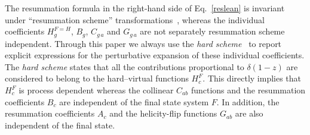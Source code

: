 \documentclass[12pt]{article}
\begin{document}
The resummation formula in the right-hand side of Eq.~\eqref{reslean} is invariant under ``resummation scheme''  transformations~\cite{Catani:2000vq}, whereas the individual coefficients $H_g^{F=H}$, $B_{g}$, $C_{g\, a}$ and $G_{g\, a}$ are not separately resummation scheme independent. Through this paper we always use the \textit{hard scheme}~\cite{Catani:2013tia} to report explicit expressions for the perturbative expansion of these individual coefficients. The \textit{hard scheme} states that all the contributions proportional to $\delta(1-z)$ are considered to belong to the hard--virtual functions $H_c^{F}$. This directly implies that $H_c^{F}$ is process dependent whereas the collinear $C_{ab}$ functions and the resummation coefficients $B_{c}$ are independent of the final state system $F$. In addition, the resummation coefficients $A_{c}$ and the helicity-flip functions $G_{ab}$ are also independent of the final state.
\end{document}
